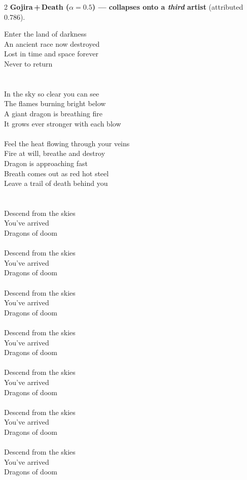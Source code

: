 \begin{multicols}{2}
\nopagebreak\noindent\textbf{Gojira\,+\,Death ($\alpha{=}0.5$) --- collapses onto a \emph{third} artist} (attributed 0.786).\par\nopagebreak\vspace{4pt}
{\footnotesize\itshape\raggedright
Enter the land of darkness \\
An ancient race now destroyed \\
Lost in time and space forever \\
Never to return \\
\mbox{} \\
\mbox{} \\
In the sky so clear you can see \\
The flames burning bright below \\
A giant dragon is breathing fire \\
It grows ever stronger with each blow \\
\mbox{} \\
Feel the heat flowing through your veins \\
Fire at will, breathe and destroy \\
Dragon is approaching fast \\
Breath comes out as red hot steel \\
Leave a trail of death behind you \\
\mbox{} \\
\mbox{} \\
Descend from the skies \\
You've arrived \\
Dragons of doom \\
\mbox{} \\
Descend from the skies \\
You've arrived \\
Dragons of doom \\
\mbox{} \\
Descend from the skies \\
You've arrived \\
Dragons of doom \\
\mbox{} \\
Descend from the skies \\
You've arrived \\
Dragons of doom \\
\mbox{} \\
Descend from the skies \\
You've arrived \\
Dragons of doom \\
\mbox{} \\
Descend from the skies \\
You've arrived \\
Dragons of doom \\
\mbox{} \\
Descend from the skies \\
You've arrived \\
Dragons of doom\par}
\medskip

\end{multicols}

\normalsize